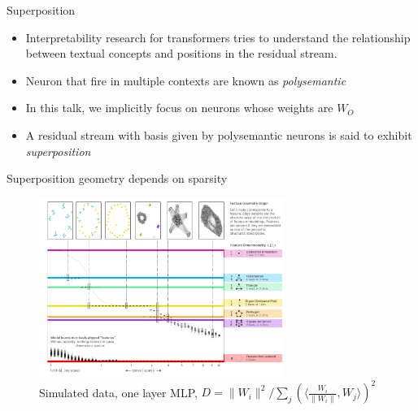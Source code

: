 \begin{frame}{Superposition}
\begin{itemize}
    \item Interpretability research for transformers tries to understand the relationship between textual concepts and positions in the residual stream.
    \item Neuron that fire in multiple contexts are known as {\it polysemantic}
    \item In this talk, we implicitly focus on neurons whose weights are $W_{O}$
    \item A residual stream with basis given by polysemantic neurons is said to exhibit {\it superposition}
\end{itemize}
\end{frame}

\begin{frame}{Superposition geometry depends on sparsity}
\begin{figure}
    \centering
    \includegraphics[width = 8cm]{img/superpositionandsparsity.png}
    \caption*{Simulated data, one layer MLP,  $D = \|W_i\|^2 / \sum_j (\langle \frac{W_i}{\|W_i\|}, W_j \rangle)^2\; $ \citep{Elhage-ob}}
    \label{fig:enter-label}
\end{figure}
\end{frame}